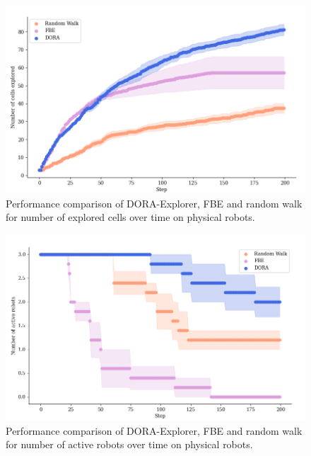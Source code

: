 \begin{figure}[htbp]
    \centering
    \captionsetup{belowskip=-5pt}
    \includegraphics[width=0.82\columnwidth]{images/explored.png}
    \caption{Performance comparison of DORA-Explorer, FBE and random walk for number of explored cells over time on physical robots.}
    \label{results:cells_explored_physical}
\end{figure}

\begin{figure}[htbp]
    \centering
    \captionsetup{belowskip=-5pt}
    \includegraphics[width=0.82\columnwidth]{images/activerobots.png}
    \caption{Performance comparison of DORA-Explorer, FBE and random walk for number of active robots over time on physical robots.}
    \label{results:active_robots_physical}
\end{figure}

